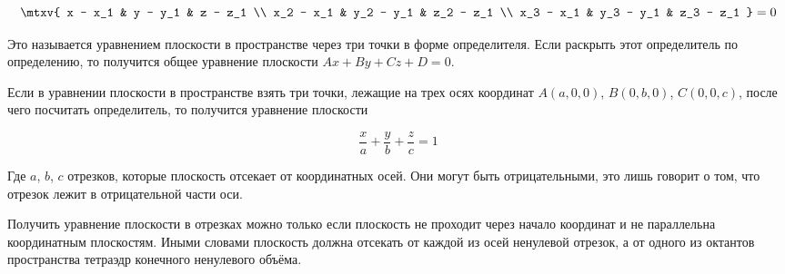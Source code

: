 \begin{equation*}
  \mtxv{
    x   - x_1 & y   - y_1 & z   - z_1 \\
    x_2 - x_1 & y_2 - y_1 & z_2 - z_1 \\
    x_3 - x_1 & y_3 - y_1 & z_3 - z_1
  }
  = 0
\end{equation*}

Это называется уравнением плоскости в пространстве через три точки в форме
определителя. Если раскрыть этот определитель по определению, то получится общее
уравнение плоскости \(Ax + By + Cz + D = 0\).


Если в уравнении плоскости в пространстве взять три точки, лежащие на трех осях
координат \(A (a, 0, 0)\), \(B (0, b, 0)\), \(C (0, 0, c)\), после чего
посчитать определитель, то получится уравнение плоскости 
  
\begin{equation*}
  \frac{x}{a} + \frac{y}{b} + \frac{z}{c} = 1    
\end{equation*}

Где \(a\), \(b\), \(c\)  отрезков, которые плоскость отсекает от
координатных осей. Они могут быть отрицательными, это лишь говорит о том, что
отрезок лежит в отрицательной части оси.

\begin{remark}
  Получить уравнение плоскости в отрезках можно только если плоскость не
  проходит через начало координат и не параллельна координатным плоскостям.
  Иными словами плоскость должна отсекать от каждой из осей ненулевой отрезок, а
  от одного из октантов пространства тетраэдр конечного ненулевого объёма.
\end{remark}
